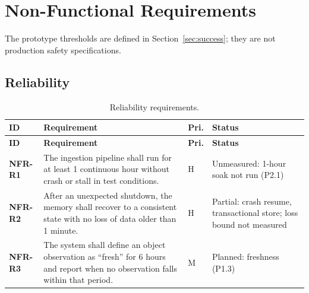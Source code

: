 \section{Non-Functional Requirements}
The prototype thresholds are defined in Section~\ref{sec:success}; they are not production safety specifications.

\subsection{Reliability}
\begin{ltab}
\begin{longtable}{@{}>{\bfseries}L{1.6cm}L{8.6cm}L{0.7cm}L{3.8cm}@{}}
\caption{Reliability requirements.}\\
\toprule
{}\textbf{ID} & \textbf{Requirement} & \textbf{Pri.} & \textbf{Status}\\
\midrule
\endfirsthead
\toprule
{}\textbf{ID} & \textbf{Requirement} & \textbf{Pri.} & \textbf{Status}\\
\midrule
\endhead
\bottomrule
\endfoot
NFR-R1 & The ingestion pipeline shall run for at least 1 continuous hour
without crash or stall in test conditions. & H & Unmeasured: 1-hour soak not run (P2.1)\\
NFR-R2 & After an unexpected shutdown, the memory shall recover to a consistent
state with no loss of data older than 1 minute. & H & Partial: crash resume, transactional store; loss bound not measured\\
NFR-R3 & The system shall define an object observation as “fresh” for 6 hours and report when no observation falls within that period. & M & Planned: freshness (P1.3)\\
\end{longtable}
\end{ltab}


